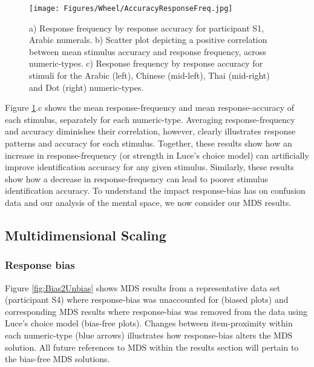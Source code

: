 \begin{figure}[tbh]
\centering \texttt{[image: Figures/Wheel/AccuracyResponseFreq.jpg]}
\caption{a) Response frequency by response accuracy for participant S1, Arabic numerals. b) Scatter plot depicting a positive correlation between mean stimulus accuracy and response frequency, across numeric-types. c) Response frequency by response accuracy for stimuli for the Arabic (left), Chinese (mid-left), Thai (mid-right) and Dot (right) numeric-types.}
\label{fig:AccRspFq}
\end{figure}

Figure \ref{fig:AccRspFq}.c shows the mean response-frequency and mean response-accuracy of each stimulus, separately for each numeric-type. Averaging response-frequency and accuracy diminishes their correlation, however, clearly illustrates response patterns and accuracy for each stimulus. Together, these results show how an increase in response-frequency (or strength in Luce's choice model) can artificially improve identification accuracy for any given stimulus. Similarly, these results show how a decrease in response-frequency can lead to poorer stimulus identification accuracy. To understand the impact response-bias has on confusion data and our analysis of the mental space, we now consider our MDS results.

\subsection{Multidimensional Scaling}
\subsubsection{Response bias}
Figure \ref{fig:Bias2Unbias} shows MDS results from a representative data set (participant S4)  where response-bias was unaccounted for (biased plots) and corresponding MDS results where response-bias was removed from the data using Luce's choice model (bias-free plots). Changes between item-proximity within each numeric-type (blue arrows) illustrates how response-bias alters the MDS solution. All future references to MDS within the results section will pertain to the bias-free MDS solutions.

